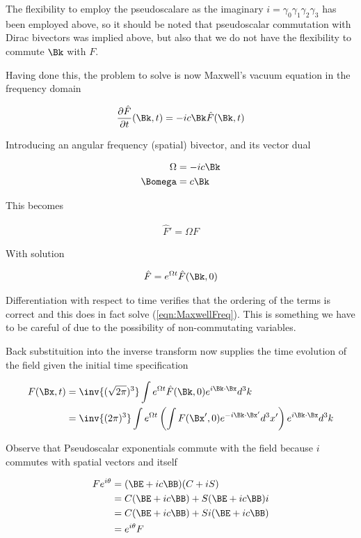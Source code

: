 \documentclass[]{eliblog}
\begin{document}
The flexibility to employ the pseudoscalare as the imaginary $i = \gamma_0 \gamma_1 \gamma_2 \gamma_3$ has been employed above, so it should
be noted that pseudoscalar commutation with Dirac bivectors was implied above, but also that we do not have the flexibility to commute $\Bk$ with $F$.

Having done this, the problem to solve is now Maxwell's vacuum equation in the frequency domain

\begin{align*}
\PD{t}{\hat{F}}(\Bk,t) = -i c \Bk \hat{F}(\Bk,t)
\end{align*}

Introducing an angular frequency (spatial) bivector, and its vector dual

\begin{align}
\Omega &= -i c \Bk \\
\Bomega &= c \Bk
\end{align}

This becomes

\begin{align}\label{eqn:MaxwellFreq}
\hat{F}' = \Omega F
\end{align}

With solution

\begin{align}
\hat{F} = e^{\Omega t} \hat{F}(\Bk,0)
\end{align}

Differentiation with respect to time verifies that the ordering of the terms is correct and this does in fact solve (\ref{eqn:MaxwellFreq}).  This
is something we have to be careful of due to the possibility of non-commutating variables.

Back substituition into the inverse transform now supplies the time evolution of the field given the initial time specification

\begin{align*}
F(\Bx,t)
&= \inv{(\sqrt{2\pi})^3} \int e^{\Omega t} \hat{F}(\Bk,0) e^{i \Bk \cdot \Bx} d^3 k \\
&= \inv{(2\pi)^3} \int e^{\Omega t} \left( \int {F}(\Bx',0) e^{-i \Bk \cdot \Bx'} d^3 x' \right) e^{i \Bk \cdot \Bx} d^3 k
\end{align*}

Observe that Pseudoscalar exponentials commute with the field because $i$ commutes with spatial vectors and itself

\begin{align*}
F e^{i\theta}
&= (\BE + i c \BB) (C + iS) \\
&=
C (\BE + i c \BB)
+ S (\BE + i c \BB) i  \\
&=
C (\BE + i c \BB)
+ S i (\BE + i c \BB) \\
&=
e^{i\theta} F
\end{align*}
\end{document}
